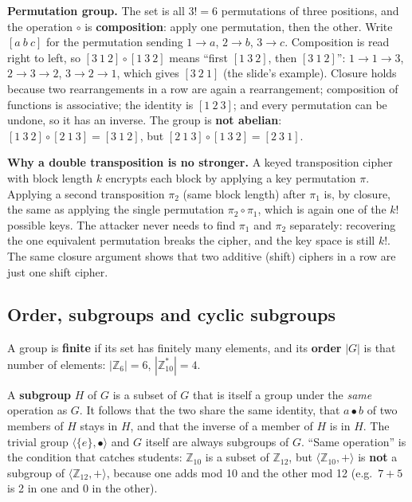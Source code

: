 \textbf{Permutation group.} The set is all $3! = 6$ permutations of three positions, and the operation $\circ$ is \textbf{composition}: apply one permutation, then the other. Write $[a\ b\ c]$ for the permutation sending $1 \to a$, $2 \to b$, $3 \to c$. Composition is read right to left, so $[3\ 1\ 2] \circ [1\ 3\ 2]$ means ``first $[1\ 3\ 2]$, then $[3\ 1\ 2]$'': $1 \to 1 \to 3$, $2 \to 3 \to 2$, $3 \to 2 \to 1$, which gives $[3\ 2\ 1]$ (the slide's example). Closure holds because two rearrangements in a row are again a rearrangement; composition of functions is associative; the identity is $[1\ 2\ 3]$; and every permutation can be undone, so it has an inverse. The group is \textbf{not abelian}: $[1\ 3\ 2] \circ [2\ 1\ 3] = [3\ 1\ 2]$, but $[2\ 1\ 3] \circ [1\ 3\ 2] = [2\ 3\ 1]$.

\textbf{Why a double transposition is no stronger.} A keyed transposition cipher with block length $k$ encrypts each block by applying a key permutation $\pi$. Applying a second transposition $\pi_2$ (same block length) after $\pi_1$ is, by closure, the same as applying the single permutation $\pi_2 \circ \pi_1$, which is again one of the $k!$ possible keys. The attacker never needs to find $\pi_1$ and $\pi_2$ separately: recovering the one equivalent permutation breaks the cipher, and the key space is still $k!$. The same closure argument shows that two additive (shift) ciphers in a row are just one shift cipher.

\subsection{Order, subgroups and cyclic subgroups}
A group is \textbf{finite} if its set has finitely many elements, and its \textbf{order} $|G|$ is that number of elements: $|\mathbb{Z}_6| = 6$, $|\mathbb{Z}_{10}^*| = 4$.

A \textbf{subgroup} $H$ of $G$ is a subset of $G$ that is itself a group under the \emph{same} operation as $G$. It follows that the two share the same identity, that $a \bullet b$ of two members of $H$ stays in $H$, and that the inverse of a member of $H$ is in $H$. The trivial group $\langle \{e\}, \bullet \rangle$ and $G$ itself are always subgroups of $G$. ``Same operation'' is the condition that catches students: $\mathbb{Z}_{10}$ is a subset of $\mathbb{Z}_{12}$, but $\langle \mathbb{Z}_{10}, + \rangle$ is \textbf{not} a subgroup of $\langle \mathbb{Z}_{12}, + \rangle$, because one adds mod 10 and the other mod 12 (e.g.\ $7 + 5$ is 2 in one and 0 in the other).

